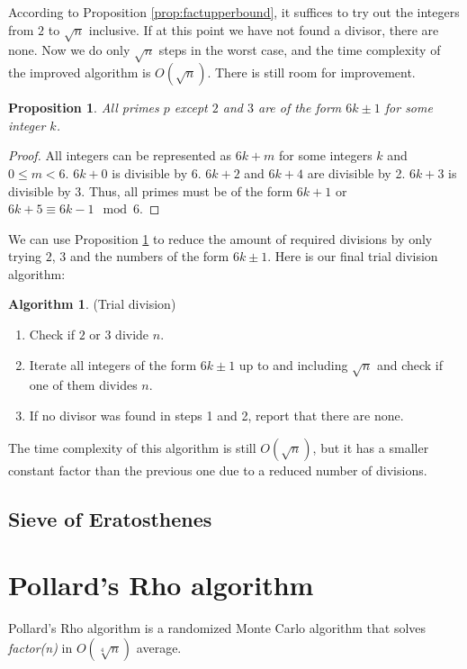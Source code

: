 \documentclass[12pt] {article}
\theoremstyle{plain}
\newtheorem{prop}[thm]{Proposition}
\theoremstyle{definition}
\newtheorem{algo}[thm]{Algorithm}
\begin{document}
According to Proposition \ref{prop:factupperbound}, it suffices to try out the integers from $2$ to $\sqrt{n}$ inclusive. If at this point we have not found a divisor, there are none. Now we do only $\sqrt{n}$ steps in the worst case, and the time complexity of the improved algorithm is $O(\sqrt{n})$. There is still room for improvement.

\begin{prop}
\label {prop:primes6pm1}
All primes $p$ except $2$ and $3$ are of the form $6k \pm 1$ for some integer $k$.
\end{prop}

\begin{proof}
All integers can be represented as $6k + m$ for some integers $k$ and $0 \leq m < 6$. $6k + 0$ is divisible by 6. $6k + 2$ and $6k + 4$ are divisible by 2. $6k + 3$ is divisible by 3. Thus, all primes must be of the form $6k + 1$ or $6k + 5 \equiv 6k - 1 \mod 6$.
\end{proof}

We can use Proposition \ref{prop:primes6pm1} to reduce the amount of required divisions by only trying $2$, $3$ and the numbers of the form $6k \pm 1$. Here is our final trial division algorithm:
\begin{algo} (Trial division)
\begin{enumerate}
\item Check if $2$ or $3$ divide $n$.
\item Iterate all integers of the form $6k \pm 1$ up to and including $\sqrt{n}$ and check if one of them divides $n$.
\item If no divisor was found in steps 1 and 2, report that there are none.
\end{enumerate}
\end{algo}

The time complexity of this algorithm is still $O(\sqrt{n})$, but it has a smaller constant factor than the previous one due to a reduced number of divisions.

\subsection {Sieve of Eratosthenes}

\section {Pollard's Rho algorithm}

Pollard's Rho algorithm is a randomized Monte Carlo algorithm that solves \textit{factor(n)} in $O(\sqrt[4]{n})$ average.
\end{document}

